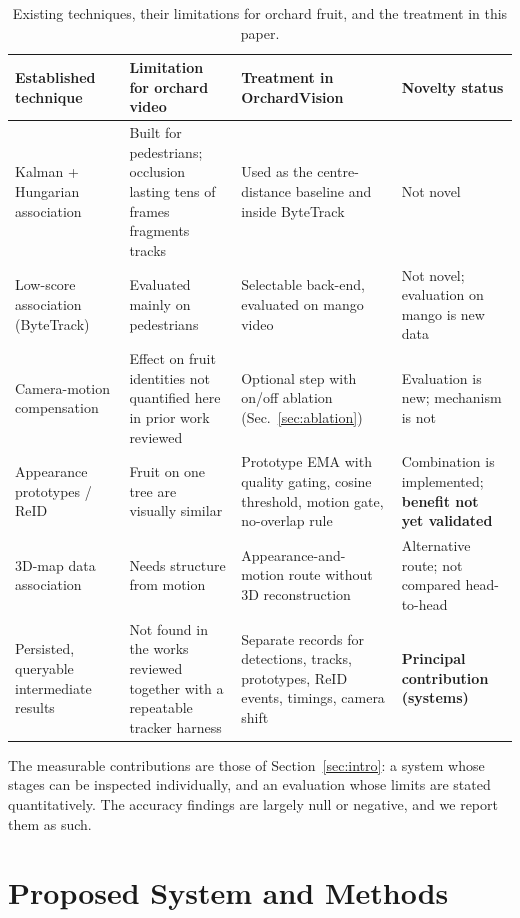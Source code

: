\documentclass[11pt,a4paper]{article}
\begin{document}
\begin{table}[t]
\caption{Existing techniques, their limitations for orchard fruit, and the treatment in this paper.}\label{tab:novelty}
\centering\footnotesize
\begin{tabular}{p{2.6cm}p{3.8cm}p{4.2cm}p{3.6cm}}
\toprule
Established technique & Limitation for orchard video & Treatment in OrchardVision & Novelty status\\
\midrule
Kalman + Hungarian association~\cite{bewley2016sort} & Built for pedestrians; occlusion lasting tens of frames fragments tracks & Used as the centre-distance baseline and inside ByteTrack & Not novel\\
Low-score association (ByteTrack)~\cite{zhang2022bytetrack} & Evaluated mainly on pedestrians & Selectable back-end, evaluated on mango video & Not novel; evaluation on mango is new data\\
Camera-motion compensation~\cite{aharon2022botsort} & Effect on fruit identities not quantified here in prior work reviewed & Optional step with on/off ablation (Sec.~\ref{sec:ablation}) & Evaluation is new; mechanism is not\\
Appearance prototypes / ReID~\cite{wojke2017deepsort,hermans2017triplet} & Fruit on one tree are visually similar & Prototype EMA with quality gating, cosine threshold, motion gate, no-overlap rule & Combination is implemented; \textbf{benefit not yet validated}\\
3D-map data association~\cite{liu2019monocular} & Needs structure from motion & Appearance-and-motion route without 3D reconstruction & Alternative route; not compared head-to-head\\
\midrule
Persisted, queryable intermediate results & Not found in the works reviewed together with a repeatable tracker harness & Separate records for detections, tracks, prototypes, ReID events, timings, camera shift & \textbf{Principal contribution (systems)}\\
\bottomrule
\end{tabular}
\end{table}

The measurable contributions are those of Section~\ref{sec:intro}: a system whose stages can be inspected individually, and an evaluation whose limits are stated quantitatively. The accuracy findings are largely null or negative, and we report them as such.

\section{Proposed System and Methods}\label{sec:methods}
\end{document}
